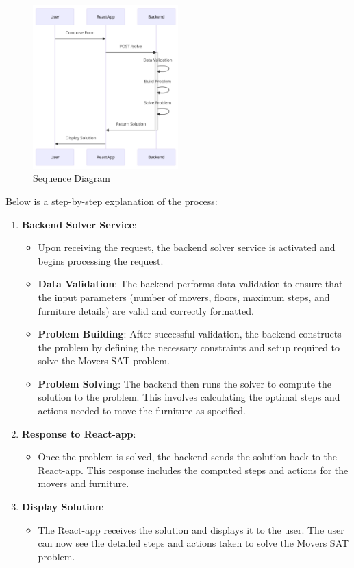 \documentclass[a4paper, 11pt]{article}
\begin{document}
\begin{figure}[H]
	\centering
	\includegraphics[width=0.5\textwidth]{./images/sequenceDiagram.png}
	\caption{Sequence Diagram}
	\label{fig:sequence-diagram}
\end{figure}

Below is a step-by-step explanation of the process:

\begin{enumerate}

	\item \textbf{Backend Solver Service}:
	      \begin{itemize}
		      \item Upon receiving the request, the backend solver service is activated and begins processing the request.
		      \item \textbf{Data Validation}: The backend performs data validation to ensure that the input parameters (number of movers, floors, maximum steps, and furniture details) are valid and correctly formatted.
		      \item \textbf{Problem Building}: After successful validation, the backend constructs the problem by defining the necessary constraints and setup required to solve the Movers SAT problem.
		      \item \textbf{Problem Solving}: The backend then runs the solver to compute the solution to the problem. This involves calculating the optimal steps and actions needed to move the furniture as specified.
	      \end{itemize}
	\item \textbf{Response to React-app}:
	      \begin{itemize}
		      \item Once the problem is solved, the backend sends the solution back to the React-app. This response includes the computed steps and actions for the movers and furniture.
	      \end{itemize}
	\item \textbf{Display Solution}:
	      \begin{itemize}
		      \item The React-app receives the solution and displays it to the user. The user can now see the detailed steps and actions taken to solve the Movers SAT problem.
	      \end{itemize}
\end{enumerate}
\end{document}
